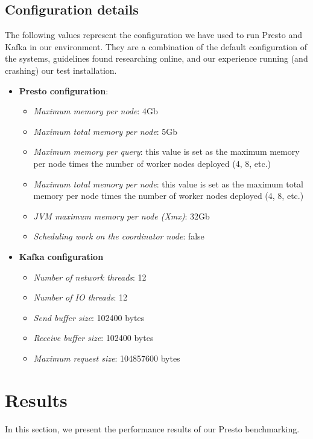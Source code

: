 \documentclass[conference]{IEEEtran}
\begin{document}
\subsection{Configuration details} \label{configuration_details_subsection}
The following values represent the configuration we have used to run Presto and Kafka in our environment. They are a combination of the default configuration of the systems, guidelines found researching online, and our experience running (and crashing) our test installation.

\begin{itemize}
    \item \textbf{Presto configuration}:
    \begin{itemize}
        \item \textit{Maximum memory per node}: 4Gb
        \item \textit{Maximum total memory per node}: 5Gb
        \item \textit{Maximum memory per query}: this value is set as the maximum memory per node times the number of worker nodes deployed (4, 8, etc.)
        \item \textit{Maximum total memory per node}: this value is set as the maximum total memory per node times the number of worker nodes deployed (4, 8, etc.)
        \item \textit{JVM maximum memory per node (Xmx)}: 32Gb
        \item \textit{Scheduling work on the coordinator node}: false
    \end{itemize}
    \item \textbf{Kafka configuration}
    \begin{itemize}
        \item \textit{Number of network threads}: 12
        \item \textit{Number of IO threads}: 12
        \item \textit{Send buffer size}: 102400 bytes
        \item \textit{Receive buffer size}: 102400 bytes
        \item \textit{Maximum request size}: 104857600 bytes
    \end{itemize}
\end{itemize}

\section{Results}\label{results}
In this section, we present the performance results of our Presto benchmarking.
\end{document}
